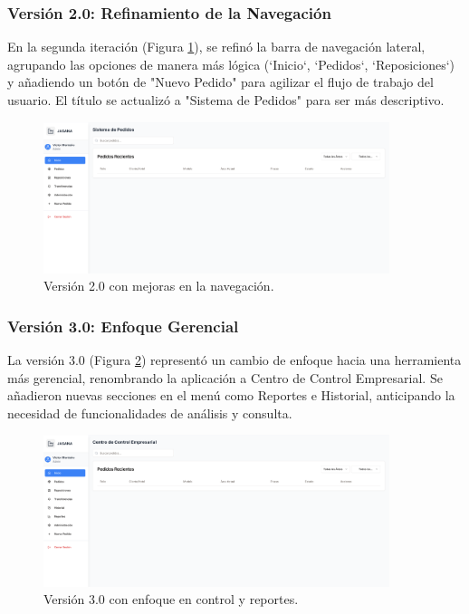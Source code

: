 \documentclass[12pt,letterpaper,spanish]{report}
\begin{document}
\subsubsection{Versión 2.0: Refinamiento de la Navegación}
En la segunda iteración (Figura \ref{fig:v2}), se refinó la barra de navegación lateral, agrupando las opciones de manera más lógica (`Inicio`, `Pedidos`, `Reposiciones`) y añadiendo un botón de "Nuevo Pedido" para agilizar el flujo de trabajo del usuario. El título se actualizó a "Sistema de Pedidos" para ser más descriptivo.

\begin{figure}[H]
    \centering
    \includegraphics[width=0.9\textwidth]{V2.0.png}
    \caption{Versión 2.0 con mejoras en la navegación.}
    \label{fig:v2}
\end{figure}

\subsubsection{Versión 3.0: Enfoque Gerencial}
La versión 3.0 (Figura \ref{fig:v3}) representó un cambio de enfoque hacia una herramienta más gerencial, renombrando la aplicación a Centro de Control Empresarial. Se añadieron nuevas secciones en el menú como Reportes e Historial, anticipando la necesidad de funcionalidades de análisis y consulta.

\begin{figure}[H]
    \centering
    \includegraphics[width=0.9\textwidth]{V3.0.png}
    \caption{Versión 3.0 con enfoque en control y reportes.}
    \label{fig:v3}
\end{figure}
\end{document}
